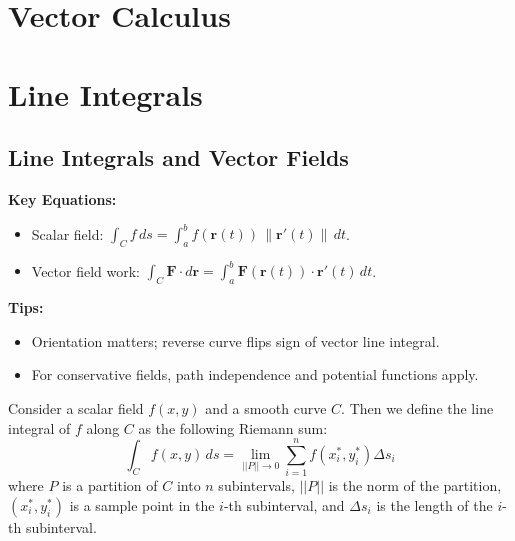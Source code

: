 \documentclass[11pt]{report}
\begin{document}
\section{Vector Calculus}
\section{Line Integrals}

\subsection{Line Integrals and Vector Fields}

\begin{keybox}
	\textbf{Key Equations:}
\begin{itemize}
    \item Scalar field: $\displaystyle \int_C f\,ds = \int_a^b f(\mathbf r(t))\,\lVert \mathbf r'(t)\rVert\,dt$.
    \item Vector field work: $\displaystyle \int_C \mathbf F\cdot d\mathbf r = \int_a^b \mathbf F(\mathbf r(t))\cdot\mathbf r'(t)\,dt$.
\end{itemize}
	\textbf{Tips:}
\begin{itemize}
    \item Orientation matters; reverse curve flips sign of vector line integral.
    \item For conservative fields, path independence and potential functions apply.
\end{itemize}
\end{keybox}
\begin{definition}
    Consider a scalar field $f(x,y) $ and a smooth curve $C$. Then we define the line integral of $f$ along $C$ as the following Riemann sum:
    $$
        \int_C f(x,y) \, ds = \lim_{||P|| \to 0} \sum_{i=1}^n f(x_i^*, y_i^*) \Delta s_i
    $$
    where $P$ is a partition of $C$ into $n$ subintervals, $||P||$ is the norm of the partition, $(x_i^*, y_i^*)$ is a sample point in the $i$-th subinterval, and $\Delta s_i$ is the length of the $i$-th subinterval.
\end{definition}
\end{document}

